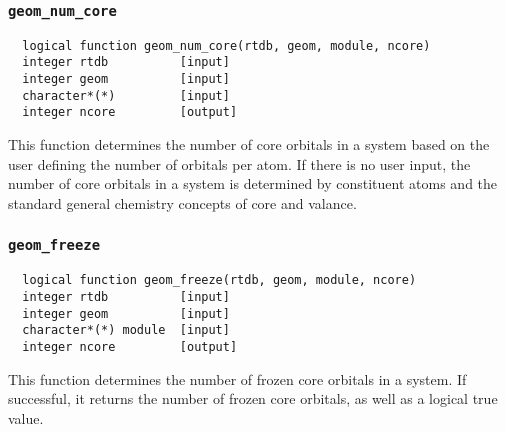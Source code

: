 \subsubsection{{\tt geom\_num\_core}}
\begin{verbatim}
  logical function geom_num_core(rtdb, geom, module, ncore)
  integer rtdb          [input]
  integer geom          [input]
  character*(*)         [input]
  integer ncore         [output]
\end{verbatim}
This function determines the number of core orbitals in a system based on the user defining
the number of orbitals per atom.  If there is no user input, the number of core orbitals in a system
is determined by constituent atoms and the standard general chemistry concepts of core and
valance.

\subsubsection{{\tt geom\_freeze}}
\begin{verbatim}
  logical function geom_freeze(rtdb, geom, module, ncore)
  integer rtdb          [input]
  integer geom          [input]
  character*(*) module  [input]
  integer ncore         [output]
\end{verbatim}
This function determines the number of frozen core orbitals in a system.  If successful,
it returns the number of frozen core orbitals, as well as a logical true value.

